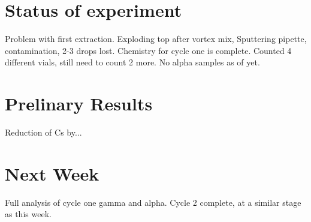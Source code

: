 \documentclass[11pt,notitlepage]{article}
\begin{document}

\section{Status of experiment}

Problem with first extraction. Exploding top after vortex mix,
Sputtering pipette, contamination, 2-3 drops lost.
Chemistry for cycle one is complete.
Counted 4 different vials, still need to count 2 more.
No alpha samples as of yet.


\section{Prelinary Results}
Reduction of Cs by...

\section{Next Week}
Full analysis of cycle one gamma and alpha.
Cycle 2 complete, at a similar stage as this week. 



\end{document}
